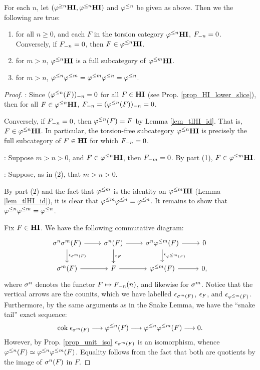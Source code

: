 \begin{prop}\label{prop_TFHI_properties}
For each $n$, let $(\THI{n}, \TFHI{n})$ and $\tlHI{n}$ be given
as above. Then we the following are true:

\begin{enumerate}
\item for all $n \geq 0$, and each $F$ in the torsion category 
$\TFHI{n}$, $\RHI[n] F = 0$. Conversely, if $\RHI[n] F = 0$, then
$F \in \TFHI{n}$.
\tinyskip

\item for $m > n$, $\TFHI{n}$ is a full subcategory of $\TFHI{m}$.
\tinyskip

\item for $m > n$, $\tlHI{n}\tlHI{m} = \tlHI{m}\tlHI{n} = \tlHI{n}$.
\tinyskip
\end{enumerate}
\end{prop}
\begin{proof}
 : Since $\RHI[n]{(\tlHI{n}(F))} = 0$ for all $F \in 
\HI$ (see Prop. \ref{prop_HI_lower_slice}), then for all $F \in 
\TFHI{n}$, $\RHI[n]{F} = \RHI[n]{(\tlHI{n}(F))} = 0$.

Conversely, if $\RHI[n]{F} = 0$, then $\tlHI{n}(F) = F$ by Lemma
\ref{lem_tlHI_id}. That is, $F \in \TFHI{n}$. In particular, the
torsion-free subcategory $\TFHI{n}$ is precisely the full 
subcategory of $F \in \HI$ for which $\RHI[n]{F} = 0$.

 : Suppose $m > n > 0$, and $F \in \TFHI{n}$, then
$\RHI[m]{F} = 0$. By part (1), $F \in \TFHI{m}$.

 : Suppose, as in (2), that $m > n > 0$.

By part (2) and the fact that $\tlHI{m}$ is the identity on 
$\TFHI{m}$ (Lemma \ref{lem_tlHI_id}), it is clear that 
$\tlHI{m}\tlHI{n} = \tlHI{n}$. It remains to show that 
$\tlHI{n}\tlHI{m} = \tlHI{n}$.

Fix $F \in \HI$. We have the following commutative diagram:
\[
\begin{tikzcd}
\sgHI{n}\sgHI{m}(F) \arrow{r}\arrow{d}{\cuHI_{\sgHI{m}(F)}} &
\sgHI{n}(F) \arrow{r}\arrow{d}{\cuHI_F} &
\sgHI{n}\tlHI{m}(F) \arrow{r}\arrow{d}{\cuHI_{\tlHI{m}(F)}} &
0 \\
\sgHI{m}(F) \arrow{r} &
F \arrow{r} &
\tlHI{m}(F) \arrow{r}&
0,
\end{tikzcd}
\]
where $\sgHI{n}$ denotes the functor $F \mapsto 
\LHI[n]{\RHI[n]{F}}$, and likewise for $\sgHI{m}$. Notice that the 
vertical arrows are the counits, which we have labelled 
$\cuHI_{\sgHI{m}(F)}$, $\cuHI_F$, and $\cuHI_{\tlHI{m}(F)}$. 
Furthermore, by the same arguments as in the Snake Lemma, we have 
the ``snake tail'' exact sequence:
\[
\cok \cuHI_{\sgHI{m}(F)} \to \tlHI{n}(F) \to \tlHI{n}\tlHI{m}(F) 
   \to 0.
\]
However, by Prop. \ref{prop_unit_iso} $\cuHI_{\sgHI{m}(F)}$ is an 
isomorphism, whence $\tlHI{n}(F) \simeq \tlHI{n}\tlHI{m}(F)$. 
Equality follows from the fact that both are quotients by the 
image of $\sgHI{n}(F)$ in $F$.
\end{proof}

